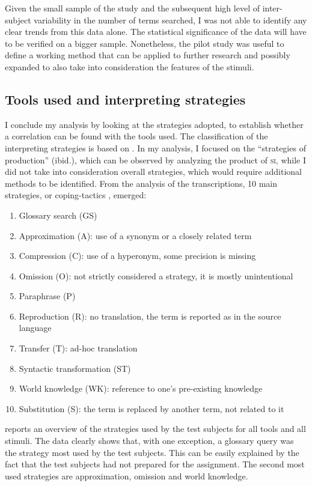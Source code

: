 \documentclass[output=paper]{langsci/langscibook}
\begin{document}
Given the small sample of the study and the subsequent high level of inter-subject variability in the number of terms searched, I was not able to identify any clear trends from this data alone. The statistical significance of the data will have to be verified on a bigger sample. Nonetheless, the pilot study was useful to define a working method that can be applied to further research and possibly expanded to also take into consideration the features of the stimuli. 

\subsection{Tools used and interpreting strategies}\label{sec:prandi:5.3}
I conclude my analysis by looking at the strategies adopted, to establish wheth\-er a correlation can be found with the tools used. The classification of the interpreting strategies is based on \citet{Bartlomiejczyk2006}. In my analysis, I focused on the ``strategies of production'' (ibid.), which can be observed by analyzing the product of \textsc{si}, while I did not take into consideration overall strategies, which would require additional methods to be identified. From the analysis of the transcriptions, 10 main strategies, or coping-tactics \citep{Gile1995}, emerged:

\begin{enumerate}
\item Glossary search (\textsc{GS})
\item Approximation (\textsc{A}): use of a synonym or a closely related term
\item Compression (\textsc{C}): use of a hyperonym, some precision is missing
\item Omission (\textsc{O}): not strictly considered a strategy, it is mostly unintentional
\item Paraphrase (\textsc{P})
\item Reproduction (\textsc{R}): no translation, the term is reported as in the source language
\item Transfer (\textsc{T}): ad-hoc translation
\item Syntactic transformation (\textsc{ST})
\item World knowledge (\textsc{WK}): reference to one’s pre-existing knowledge
\item Substitution (\textsc{S}): the term is replaced by another term, not related to it
\end{enumerate}


 reports an overview of the strategies used by the test subjects for all tools and all stimuli. The data clearly shows that, with one exception, a glossary query was the strategy most used by the test subjects. This can be easily explained by the fact that the test subjects had not prepared for the assignment. The second most used strategies are approximation, omission and world knowledge.
\end{document}
